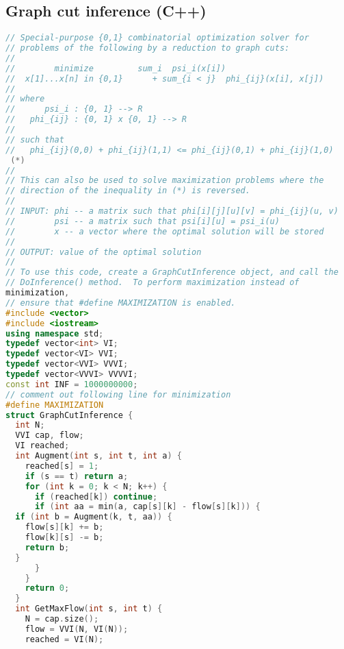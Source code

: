 \subsection{Graph cut inference (C++)}
\begin{lstlisting}[language=C++]
// Special-purpose {0,1} combinatorial optimization solver for
// problems of the following by a reduction to graph cuts:
//
//        minimize         sum_i  psi_i(x[i]) 
//  x[1]...x[n] in {0,1}      + sum_{i < j}  phi_{ij}(x[i], x[j])
//
// where
//      psi_i : {0, 1} --> R
//   phi_{ij} : {0, 1} x {0, 1} --> R
//
// such that
//   phi_{ij}(0,0) + phi_{ij}(1,1) <= phi_{ij}(0,1) + phi_{ij}(1,0) 
 (*)
//
// This can also be used to solve maximization problems where the
// direction of the inequality in (*) is reversed.
//
// INPUT: phi -- a matrix such that phi[i][j][u][v] = phi_{ij}(u, v)
//        psi -- a matrix such that psi[i][u] = psi_i(u)
//        x -- a vector where the optimal solution will be stored
//
// OUTPUT: value of the optimal solution
//
// To use this code, create a GraphCutInference object, and call the
// DoInference() method.  To perform maximization instead of 
minimization,
// ensure that #define MAXIMIZATION is enabled.
#include <vector>
#include <iostream>
using namespace std;
typedef vector<int> VI;
typedef vector<VI> VVI;
typedef vector<VVI> VVVI;
typedef vector<VVVI> VVVVI;
const int INF = 1000000000;
// comment out following line for minimization
#define MAXIMIZATION
struct GraphCutInference {
  int N;
  VVI cap, flow;
  VI reached;
  int Augment(int s, int t, int a) {
    reached[s] = 1;
    if (s == t) return a; 
    for (int k = 0; k < N; k++) {
      if (reached[k]) continue;
      if (int aa = min(a, cap[s][k] - flow[s][k])) {
  if (int b = Augment(k, t, aa)) {
    flow[s][k] += b;
    flow[k][s] -= b;
    return b;
  }
      }
    }
    return 0;
  }
  int GetMaxFlow(int s, int t) {
    N = cap.size();
    flow = VVI(N, VI(N));
    reached = VI(N);
    

\end{lstlisting}
